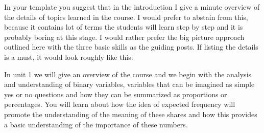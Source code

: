 \documentclass[
  letterpaper,
]{scrbook}
\begin{document}
\begin{tcolorbox}[enhanced jigsaw, toprule=.15mm, colbacktitle=quarto-callout-caution-color!10!white, breakable, coltitle=black, rightrule=.15mm, bottomtitle=1mm, bottomrule=.15mm, titlerule=0mm, title=\textcolor{quarto-callout-caution-color}{\faFire}\hspace{0.5em}{Comment for Seitwerk}, arc=.35mm, leftrule=.75mm, toptitle=1mm, left=2mm, opacityback=0, opacitybacktitle=0.6, colframe=quarto-callout-caution-color-frame, colback=white]

In your template you suggest that in the introduction I give a minute
overview of the details of topics learned in the course. I would prefer
to abstain from this, because it contains lot of terms the students will
learn step by step and it is probably boring at this stage. I would
rather prefer the big picture approach outlined here with the three
basic skills as the guiding posts. If listing the details is a must, it
would look roughly like this:

\begin{tcolorbox}[enhanced jigsaw, toprule=.15mm, colbacktitle=quarto-callout-note-color!10!white, breakable, coltitle=black, rightrule=.15mm, bottomtitle=1mm, bottomrule=.15mm, titlerule=0mm, title=\textcolor{quarto-callout-note-color}{\faInfo}\hspace{0.5em}{Unit 1: Overview; Categorical Data and Proportions}, arc=.35mm, leftrule=.75mm, toptitle=1mm, left=2mm, opacityback=0, opacitybacktitle=0.6, colframe=quarto-callout-note-color-frame, colback=white]
In unit 1 we will give an overview of the course and we begin with the
analysis and understanding of binary variables, variables that can be
imagined as simple yes or no questions and how they can be summarized as
proportions or percentages. You will learn about how the idea of
expected frequency will promote the understanding of the meaning of
these shares and how this provides a basic understanding of the
importance of these numbers.
\end{tcolorbox}


\end{tcolorbox}
\end{document}
